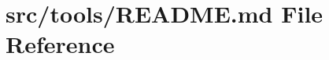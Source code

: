 \hypertarget{src_2tools_2README_8md}{}\section{src/tools/\+R\+E\+A\+D\+ME.md File Reference}
\label{src_2tools_2README_8md}
